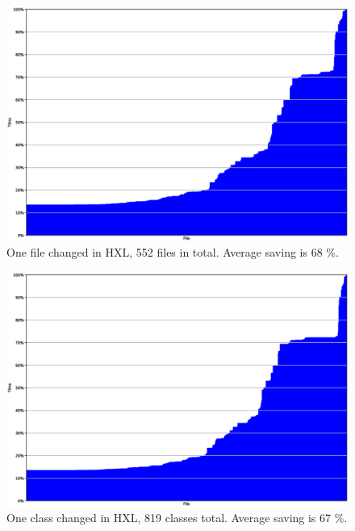 \documentclass{cslthse-msc}
\begin{document}
\begin{figure}[!htbp]
    \centering
    \includegraphics[width=\textwidth]{Graphs/HXL_one_file.eps}
    \caption{One file changed in HXL, 552 files in total. Average saving is 68 \%.}
    \label{fig:hxlonefile}
\end{figure}

\begin{figure}[!htbp]
    \centering
    \includegraphics[width=\textwidth]{Graphs/HXL_one_model.eps}
    \caption{One class changed in HXL, 819 classes total. Average saving is 67 \%.}
    \label{fig:hxlonemodel}
\end{figure}
\end{document}
